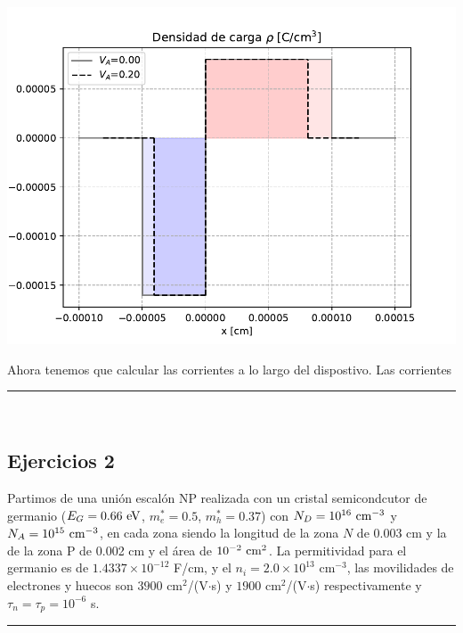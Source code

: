 \begin{enumerate}[label=\alph*)]
\begin{center}
    \end{center}   
    \begin{center}
        \includegraphics[width=0.6\linewidth]{Cuerpo/Ch_03/03_06_rho.pdf}
    \end{center}   
    Ahora tenemos que calcular las corrientes a lo largo del dispostivo. Las corrientes 
\end{enumerate}    

\rule{\textwidth}{0.1pt} \\[2pt]

\subsection{Ejercicios 2}

Partimos de una unión escalón NP realizada con un cristal semicondcutor de germanio ($E_G = 0.66 \ \eV$, $m_e^*=0.5$, $m_h^* = 0.37$) con $N_D=10^{16} \ \text{cm}^{-3}$ y $N_A = 10^{15} \ \text{cm}^{-3}$, en cada zona siendo la longitud de la zona $N$ de 0.003 cm y la de la zona P de 0.002 cm y el área de $10^{-2} \ \text{cm}^2$. La permitividad para el germanio es de $1.4337 \times 10^{-12}$ F/cm, y el $n_i=2.0 \times 10^{13}$ cm$^{-3}$, las movilidades de electrones y huecos son $3900$ cm$^2$/(V$\cdot$s) y $1900$ cm$^2$/(V$\cdot$s) respectivamente y $\tau_n=\tau_p=10^{-6}$ s.


\rule{\textwidth}{0.1pt} \\[2pt]
